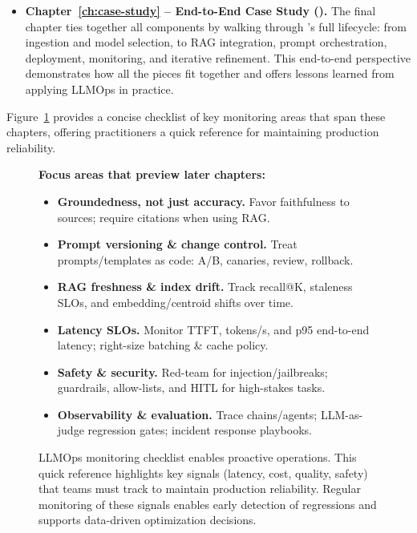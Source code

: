 \begin{itemize}
    \item \textbf{Chapter~\ref{ch:case-study} -- End-to-End Case Study (\ishtar{}).}
    The final chapter ties together all components by walking through \ishtar{}'s full lifecycle: from ingestion and model selection, to RAG integration, prompt orchestration, deployment, monitoring, and iterative refinement. This end-to-end perspective demonstrates how all the pieces fit together and offers lessons learned from applying LLMOps in practice.
\end{itemize}

Figure~\ref{fig:ch01_llmops_quick_checklist} provides a concise checklist of key monitoring areas that span these chapters, offering practitioners a quick reference for maintaining production reliability.


\begin{figure}[t]
\centering
\begin{llmfigbox}
\begin{tcolorbox}[
  title={\textbf{What to watch in LLMOps (quick reference)}},
  colback=llmblue!8,
  colframe=llmblue!70,
  colbacktitle=llmblue!18,
  coltitle=black,
  fonttitle=\bfseries,
  boxrule=0.7pt,
  arc=4pt,
  left=5mm, right=5mm, top=4mm, bottom=4mm,
  before skip=6pt,
  after skip=6pt
]
\small
{}

\textbf{Focus areas that preview later chapters:}

\begin{itemize}
  \item \textbf{Groundedness, not just accuracy.} Favor faithfulness to sources; require citations when using RAG.
  \item \textbf{Prompt versioning \& change control.} Treat prompts/templates as code: A/B, canaries, review, rollback.
  \item \textbf{RAG freshness \& index drift.} Track recall@K, staleness SLOs, and embedding/centroid shifts over time.
  \item \textbf{Latency SLOs.} Monitor TTFT, tokens/s, and p95 end-to-end latency; right-size batching \& cache policy.
  \item \textbf{Safety \& security.} Red-team for injection/jailbreaks; guardrails, allow-lists, and HITL for high-stakes tasks.
  \item \textbf{Observability \& evaluation.} Trace chains/agents; LLM-as-judge regression gates; incident response playbooks.
\end{itemize}

\end{tcolorbox}
\end{llmfigbox}
\caption{LLMOps monitoring checklist enables proactive operations. This quick reference highlights key signals (latency, cost, quality, safety) that teams must track to maintain production reliability. Regular monitoring of these signals enables early detection of regressions and supports data-driven optimization decisions.}
\label{fig:ch01_llmops_quick_checklist}
\end{figure}

